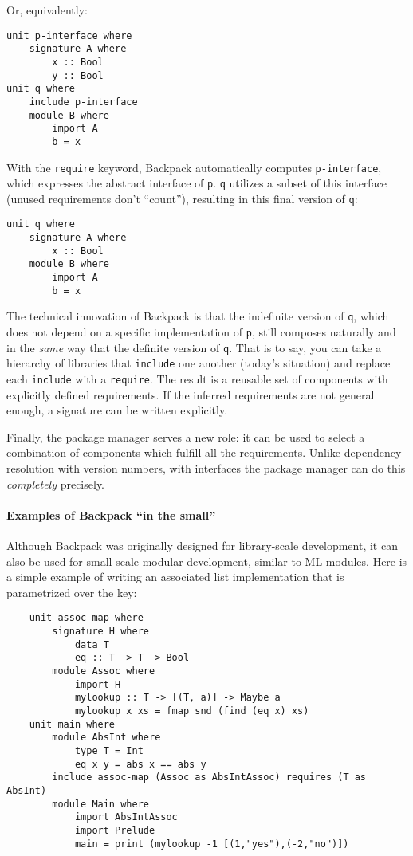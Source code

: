 \documentclass{article}
\begin{document}
Or, equivalently:

\begin{verbatim}
unit p-interface where
    signature A where
        x :: Bool
        y :: Bool
unit q where
    include p-interface
    module B where
        import A
        b = x
\end{verbatim}

With the \verb|require| keyword, Backpack automatically computes
\verb|p-interface|, which expresses the abstract interface of \verb|p|.
\verb|q| utilizes a subset of this interface (unused requirements
don't ``count''), resulting in this final version of \verb|q|:

\begin{verbatim}
unit q where
    signature A where
        x :: Bool
    module B where
        import A
        b = x
\end{verbatim}

The technical innovation of Backpack is that the indefinite version of \verb|q|, which
does not depend on a specific implementation of \verb|p|, still composes
naturally and in the \emph{same} way that the definite version of
\verb|q|.  That is to say, you can take a hierarchy of libraries that \verb|include| one
another (today's situation) and replace each \verb|include| with a
\verb|require|. The result is a reusable set of components with
explicitly defined requirements.  If the inferred requirements are not
general enough, a signature can be written explicitly.

Finally, the package manager serves a new role: it can be used to select
a combination of components which fulfill all the requirements.  Unlike
dependency resolution with version numbers, with interfaces the package
manager can do this \emph{completely} precisely.

\paragraph{Examples of Backpack ``in the small''}
Although Backpack was originally designed for library-scale development,
it can also be used for small-scale modular development,
similar to ML modules.  Here is a simple example of writing an
associated list implementation that is parametrized over the key:

\begin{verbatim}
    unit assoc-map where
        signature H where
            data T
            eq :: T -> T -> Bool
        module Assoc where
            import H
            mylookup :: T -> [(T, a)] -> Maybe a
            mylookup x xs = fmap snd (find (eq x) xs)
    unit main where
        module AbsInt where
            type T = Int
            eq x y = abs x == abs y
        include assoc-map (Assoc as AbsIntAssoc) requires (T as AbsInt)
        module Main where
            import AbsIntAssoc
            import Prelude
            main = print (mylookup -1 [(1,"yes"),(-2,"no")])
\end{verbatim}
\end{document}
